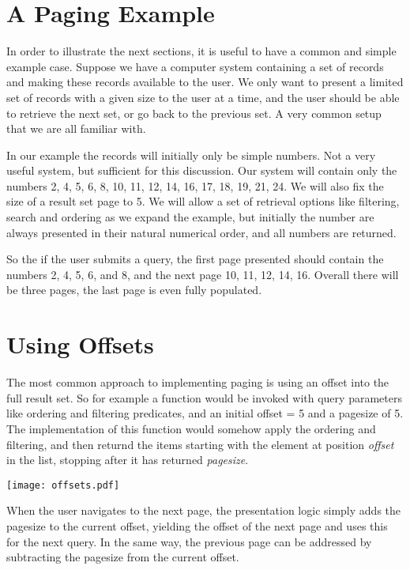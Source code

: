 \documentclass[11pt,a4paper]{article}
\begin{document}
\begin{multicols*}{2}
\section*{A Paging Example}
In order to illustrate the next sections, it is useful to have a common and
simple example case. Suppose we have a computer system containing a set of
records and making these records available to the user. We only want to present
a limited set of records with a given size to the user at a time, and the user 
should be able to retrieve the next set, or go back to the previous set. A very
common setup that we are all familiar with.

In our example the records will initially only be simple numbers. Not a very
useful system, but sufficient for this discussion. Our system will contain only
the numbers 2, 4, 5, 6, 8, 10, 11, 12, 14, 16, 17, 18, 19, 21, 24. We will
also fix the size of a result set page to 5. We will allow a set of retrieval
options like filtering, search and ordering as we expand the example, but
initially the number are always presented in their natural numerical order, and
all numbers are returned. 

So the if the user submits a query, the first page presented should contain the
numbers 2, 4, 5, 6, and 8, and the next page 10, 11, 12, 14, 16. Overall there
will be three pages, the last page is even fully populated.

\section*{Using Offsets}
The most common approach to implementing paging is using an offset into the full
result set. So for example a function would be invoked with query parameters
like ordering and filtering predicates, and an initial offset = 5 and a
pagesize of 5. The implementation of this function would somehow apply the
ordering and filtering, and then returnd the items starting with the element at
position {\em offset} in the list, stopping after it has returned {\em
pagesize}. 

\texttt{[image: offsets.pdf]}

When the user navigates to the next page, the presentation logic simply adds the
pagesize to the current offset, yielding the offset of the next page and uses
this for the next query. In the same way, the previous page can be addressed by
subtracting the pagesize from the current offset. 


\end{multicols*}
\end{document}
